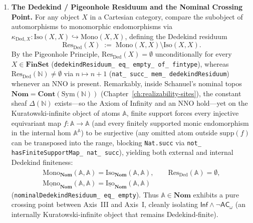 \begin{enumerate}
  \item \textbf{The Dedekind / Pigeonhole Residuum and the Nominal Crossing Point.} For any object $X$ in a Cartesian category, compare the subobject of automorphisms to monomorphic endomorphisms via $\kappa_{\mathrm{Ded}, X} : \mathrm{Iso}(X, X) \hookrightarrow \mathrm{Mono}(X, X)$, defining the Dedekind residuum
  \[
    \mathrm{Res}_{\mathrm{Ded}}(X) \;:=\; \mathrm{Mono}(X, X) \setminus \mathrm{Iso}(X, X).
  \]
  By the Pigeonhole Principle, $\mathrm{Res}_{\mathrm{Ded}}(X) = \emptyset$ unconditionally for every $X \in \mathbf{FinSet}$ (\texttt{dedekindResiduum\_ eq\_ empty\_ of\_ fintype}), whereas $\mathrm{Res}_{\mathrm{Ded}}(\mathbb{N}) \neq \emptyset$ via $n \mapsto n + 1$ (\texttt{nat\_ succ\_ mem\_ dedekindResiduum}) whenever an $\mathrm{NNO}$ is present. Remarkably, inside Schanuel's nominal topos $\mathbf{Nom} = \mathbf{Cont}(\mathrm{Sym}(\mathbb{N}))$ (Chapter~\ref{ch:realizability-sites}), the constant sheaf $\Delta(\mathbb{N})$ exists---so the Axiom of Infinity and an $\mathrm{NNO}$ hold---yet on the Kuratowski-infinite object of atoms $\mathbb{A}$, finite support forces every injective equivariant map $f : \mathbb{A} \to \mathbb{A}$ (and every finitely supported monic endomorphism in the internal hom $\mathbb{A}^{\mathbb{A}}$) to be surjective (any omitted atom outside $\mathrm{supp}(f)$ can be transposed into the range, blocking \texttt{Nat.succ} via \texttt{not\_ hasFiniteSupportMap\_ nat\_ succ}), yielding both external and internal Dedekind finiteness:
  \[
    \begin{gathered}
      \mathrm{Mono}_{\mathbf{Nom}}(\mathbb{A}, \mathbb{A}) = \mathrm{Iso}_{\mathbf{Nom}}(\mathbb{A}, \mathbb{A}), \qquad
      \mathrm{Res}_{\mathrm{Ded}}(\mathbb{A}) = \emptyset, \\
      \underline{\mathrm{Mono}}_{\mathbf{Nom}}(\mathbb{A}, \mathbb{A}) = \underline{\mathrm{Iso}}_{\mathbf{Nom}}(\mathbb{A}, \mathbb{A})
    \end{gathered}
  \]
  (\texttt{nominalDedekindResiduum\_ eq\_ empty}). Thus $\mathbb{A} \in \mathbf{Nom}$ exhibits a pure crossing point between Axis~III and Axis~I, cleanly isolating $\mathsf{Inf} \wedge \neg\mathsf{AC}_\omega$ (an internally Kuratowski-infinite object that remains Dedekind-finite).


\end{enumerate}
